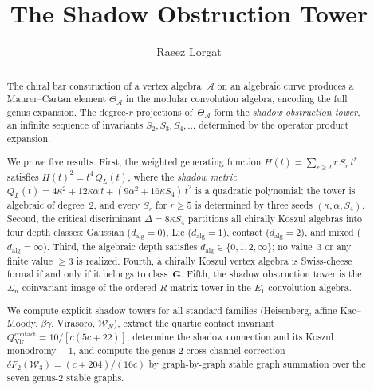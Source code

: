 \documentclass[11pt,reqno]{amsart}
\theoremstyle{definition}
\theoremstyle{remark}
\newcommand{\cA}{\mathcal{A}}
\newcommand{\cW}{\mathcal{W}}
\newcommand{\Vir}{\mathrm{Vir}}
\numberwithin{equation}{section}
\begin{document}
\title[The Shadow Obstruction Tower]
{The Shadow Obstruction Tower}

\author{Raeez Lorgat}
\address{Perimeter Institute for Theoretical Physics,
 Waterloo, ON N2L 2Y5, Canada}

\date{}

\begin{abstract}
The chiral bar construction of a vertex algebra~$\cA$ on an
algebraic curve produces a Maurer--Cartan element
$\Theta_\cA$ in the modular convolution algebra, encoding
the full genus expansion. The degree-$r$ projections
of~$\Theta_\cA$ form the \emph{shadow obstruction tower},
an infinite sequence of invariants $S_2, S_3, S_4, \ldots$
determined by the operator product expansion.

We prove five results.
First, the weighted generating function
$H(t) = \sum_{r \ge 2} r\, S_r\, t^r$ satisfies
$H(t)^2 = t^4\, Q_L(t)$, where the \emph{shadow metric}
$Q_L(t) = 4\kappa^2 + 12\kappa\alpha\, t
+ (9\alpha^2 + 16\kappa S_4)\, t^2$
is a quadratic polynomial: the tower is algebraic
of degree~$2$, and every $S_r$ for $r \ge 5$ is
determined by three seeds $(\kappa, \alpha, S_4)$.
Second, the critical discriminant $\Delta = 8\kappa S_4$
partitions all chirally Koszul algebras into four depth
classes: Gaussian ($d_{\mathrm{alg}} = 0$), Lie
($d_{\mathrm{alg}} = 1$), contact ($d_{\mathrm{alg}} = 2$),
and mixed ($d_{\mathrm{alg}} = \infty$).
Third, the algebraic depth satisfies
$d_{\mathrm{alg}} \in \{0, 1, 2, \infty\}$; no
value~$3$ or any finite value $\ge 3$ is realized.
Fourth, a chirally Koszul vertex algebra is Swiss-cheese
formal if and only if it belongs to class~$\mathbf{G}$.
Fifth, the shadow obstruction tower is the
$\Sigma_n$-coinvariant image of the ordered $R$-matrix
tower in the $E_1$ convolution algebra.

We compute explicit shadow towers for all standard families
(Heisenberg, affine Kac--Moody, $\beta\gamma$, Virasoro,
$\cW_N$), extract the quartic contact invariant
$Q^{\mathrm{contact}}_{\Vir} = 10/[c(5c+22)]$,
determine the shadow connection and its Koszul
monodromy~$-1$, and compute the genus-$2$ cross-channel
correction $\delta F_2(\cW_3) = (c + 204)/(16c)$
by graph-by-graph stable graph summation over the seven
genus-$2$ stable graphs.
\end{abstract}


\end{document}
